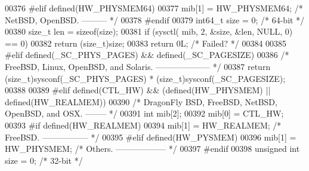 \begin{DoxyCode}
{{{00376 \textcolor{preprocessor}{#}\textcolor{preprocessor}{elif} \textcolor{preprocessor}{defined}\textcolor{preprocessor}{(}\textcolor{preprocessor}{HW\_PHYSMEM64}\textcolor{preprocessor}{)}
00377     mib[1] = HW\_PHYSMEM64;          \textcolor{comment}{/* NetBSD, OpenBSD. --------- */}
00378 \textcolor{preprocessor}{#}\textcolor{preprocessor}{endif}
00379     int64\_t size = 0;               \textcolor{comment}{/* 64-bit */}
00380     size\_t len = \textcolor{keyword}{sizeof}(size);
00381     \textcolor{keywordflow}{if} (sysctl( mib, 2, &size, &len, NULL, 0) == 0)
00382         \textcolor{keywordflow}{return} (size\_t)size;
00383     \textcolor{keywordflow}{return} 0L;          \textcolor{comment}{/* Failed? */}
00384 
00385 \textcolor{preprocessor}{#}\textcolor{preprocessor}{elif} \textcolor{preprocessor}{defined}\textcolor{preprocessor}{(}\_SC\_PHYS\_PAGES\textcolor{preprocessor}{)} \textcolor{preprocessor}{&&} \textcolor{preprocessor}{defined}\textcolor{preprocessor}{(}\_SC\_PAGESIZE\textcolor{preprocessor}{)}
00386     \textcolor{comment}{/* FreeBSD, Linux, OpenBSD, and Solaris. -------------------- */}
00387     \textcolor{keywordflow}{return} (size\_t)sysconf(\_SC\_PHYS\_PAGES) * (size\_t)sysconf(\_SC\_PAGESIZE);
00388 
00389 \textcolor{preprocessor}{#}\textcolor{preprocessor}{elif} \textcolor{preprocessor}{defined}\textcolor{preprocessor}{(}\textcolor{preprocessor}{CTL\_HW}\textcolor{preprocessor}{)} \textcolor{preprocessor}{&&} \textcolor{preprocessor}{(}\textcolor{preprocessor}{defined}\textcolor{preprocessor}{(}\textcolor{preprocessor}{HW\_PHYSMEM}\textcolor{preprocessor}{)} \textcolor{preprocessor}{||} \textcolor{preprocessor}{defined}\textcolor{preprocessor}{(}\textcolor{preprocessor}{HW\_REALMEM}\textcolor{preprocessor}{)}\textcolor{preprocessor}{)}
00390     \textcolor{comment}{/* DragonFly BSD, FreeBSD, NetBSD, OpenBSD, and OSX. -------- */}
00391     \textcolor{keywordtype}{int} mib[2];
00392     mib[0] = CTL\_HW;
00393 \textcolor{preprocessor}{#}\textcolor{preprocessor}{if} \textcolor{preprocessor}{defined}\textcolor{preprocessor}{(}\textcolor{preprocessor}{HW\_REALMEM}\textcolor{preprocessor}{)}
00394     mib[1] = HW\_REALMEM;        \textcolor{comment}{/* FreeBSD. ----------------- */}
00395 \textcolor{preprocessor}{#}\textcolor{preprocessor}{elif} \textcolor{preprocessor}{defined}\textcolor{preprocessor}{(}\textcolor{preprocessor}{HW\_PYSMEM}\textcolor{preprocessor}{)}
00396     mib[1] = HW\_PHYSMEM;        \textcolor{comment}{/* Others. ------------------ */}
00397 \textcolor{preprocessor}{#}\textcolor{preprocessor}{endif}
00398     \textcolor{keywordtype}{unsigned} \textcolor{keywordtype}{int} size = 0;      \textcolor{comment}{/* 32-bit */}
}}}
\end{DoxyCode}
